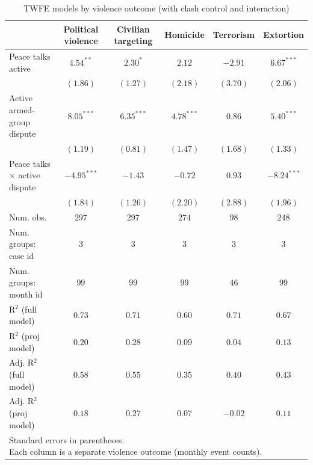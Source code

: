 
\begin{table}
\caption{TWFE models by violence outcome (with clash control and interaction)}
\begin{center}
\begin{tabular}{l c c c c c}
\toprule
 & Political violence & Civilian targeting & Homicide & Terrorism & Extortion \\
\midrule
Peace talks active           & $4.54^{**}$   & $2.30^{*}$   & $2.12$       & $-2.91$  & $6.67^{***}$  \\
                             & $(1.86)$      & $(1.27)$     & $(2.18)$     & $(3.70)$ & $(2.06)$      \\
Active armed-group dispute   & $8.05^{***}$  & $6.35^{***}$ & $4.78^{***}$ & $0.86$   & $5.40^{***}$  \\
                             & $(1.19)$      & $(0.81)$     & $(1.47)$     & $(1.68)$ & $(1.33)$      \\
Peace talks × active dispute & $-4.95^{***}$ & $-1.43$      & $-0.72$      & $0.93$   & $-8.24^{***}$ \\
                             & $(1.84)$      & $(1.26)$     & $(2.20)$     & $(2.88)$ & $(1.96)$      \\
\midrule
Num. obs.                    & $297$         & $297$        & $274$        & $98$     & $248$         \\
Num. groups: case id        & $3$           & $3$          & $3$          & $3$      & $3$           \\
Num. groups: month id       & $99$          & $99$         & $99$         & $46$     & $99$          \\
R$^2$ (full model)           & $0.73$        & $0.71$       & $0.60$       & $0.71$   & $0.67$        \\
R$^2$ (proj model)           & $0.20$        & $0.28$       & $0.09$       & $0.04$   & $0.13$        \\
Adj. R$^2$ (full model)      & $0.58$        & $0.55$       & $0.35$       & $0.40$   & $0.43$        \\
Adj. R$^2$ (proj model)      & $0.18$        & $0.27$       & $0.07$       & $-0.02$  & $0.11$        \\
\bottomrule
\multicolumn{6}{l}{\scriptsize{\parbox{\linewidth}{Standard errors in parentheses.\\[0.35em] Each column is a separate violence outcome (monthly event counts).}}}
\end{tabular}
\label{tab:violence_twfe}
\end{center}
\end{table}
